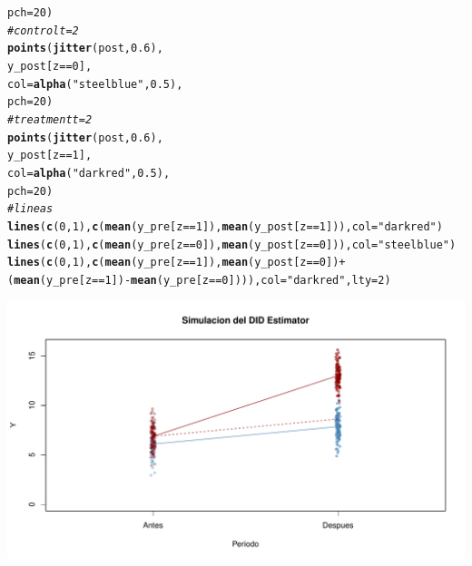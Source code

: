 \documentclass[onesided]{article}\usepackage[]{graphicx}\usepackage[]{color}
\makeatletter
\def\maxwidth{ %
  \ifdim\Gin@nat@width>\linewidth
    \linewidth
  \else
    \Gin@nat@width
  \fi
}
\newcommand{\hlnum}[1]{\textcolor[rgb]{0.686,0.059,0.569}{#1}}%
\newcommand{\hlstr}[1]{\textcolor[rgb]{0.192,0.494,0.8}{#1}}%
\newcommand{\hlcom}[1]{\textcolor[rgb]{0.678,0.584,0.686}{\textit{#1}}}%
\newcommand{\hlopt}[1]{\textcolor[rgb]{0,0,0}{#1}}%
\newcommand{\hlstd}[1]{\textcolor[rgb]{0.345,0.345,0.345}{#1}}%
\newcommand{\hlkwc}[1]{\textcolor[rgb]{0.333,0.667,0.333}{#1}}%
\newcommand{\hlkwd}[1]{\textcolor[rgb]{0.737,0.353,0.396}{\textbf{#1}}}%
\newenvironment{kframe}{%
 \def\at@end@of@kframe{}%
 \ifinner\ifhmode%
  \def\at@end@of@kframe{\end{minipage}}%
  \begin{minipage}{\columnwidth}%
 \fi\fi%
 \def\FrameCommand##1{\hskip\@totalleftmargin \hskip-\fboxsep
 \colorbox{shadecolor}{##1}\hskip-\fboxsep
     \hskip-\linewidth \hskip-\@totalleftmargin \hskip\columnwidth}%
 \MakeFramed {\advance\hsize-\width
   \@totalleftmargin\z@ \linewidth\hsize
   \@setminipage}}%
 {\par\unskip\endMakeFramed%
 \at@end@of@kframe}
\newenvironment{knitrout}{}{} %
\makeatother
\begin{document}
\begin{knitrout}
\begin{kframe}
\begin{alltt}
       \hlkwc{pch} \hlstd{=} \hlnum{20}\hlstd{)}
\hlcom{# control t=2}
\hlkwd{points}\hlstd{(}\hlkwd{jitter}\hlstd{(post,} \hlnum{0.6}\hlstd{),}
       \hlstd{y_post[z} \hlopt{==} \hlnum{0}\hlstd{],}
       \hlkwc{col} \hlstd{=} \hlkwd{alpha}\hlstd{(}\hlstr{"steelblue"}\hlstd{,} \hlnum{0.5}\hlstd{),}
       \hlkwc{pch} \hlstd{=} \hlnum{20}\hlstd{)}
\hlcom{# treatment t=2}
\hlkwd{points}\hlstd{(}\hlkwd{jitter}\hlstd{(post,} \hlnum{0.6}\hlstd{),}
       \hlstd{y_post[z} \hlopt{==} \hlnum{1}\hlstd{],}
       \hlkwc{col} \hlstd{=} \hlkwd{alpha}\hlstd{(}\hlstr{"darkred"}\hlstd{,} \hlnum{0.5}\hlstd{),}
       \hlkwc{pch} \hlstd{=} \hlnum{20}\hlstd{)}
\hlcom{# lineas}
\hlkwd{lines}\hlstd{(}\hlkwd{c}\hlstd{(}\hlnum{0}\hlstd{,} \hlnum{1}\hlstd{),} \hlkwd{c}\hlstd{(}\hlkwd{mean}\hlstd{(y_pre[z} \hlopt{==} \hlnum{1}\hlstd{]),} \hlkwd{mean}\hlstd{(y_post[z} \hlopt{==} \hlnum{1}\hlstd{])),} \hlkwc{col} \hlstd{=} \hlstr{"darkred"}\hlstd{)}
\hlkwd{lines}\hlstd{(}\hlkwd{c}\hlstd{(}\hlnum{0}\hlstd{,} \hlnum{1}\hlstd{),} \hlkwd{c}\hlstd{(}\hlkwd{mean}\hlstd{(y_pre[z} \hlopt{==} \hlnum{0}\hlstd{]),} \hlkwd{mean}\hlstd{(y_post[z} \hlopt{==} \hlnum{0}\hlstd{])),} \hlkwc{col} \hlstd{=} \hlstr{"steelblue"}\hlstd{)}
\hlkwd{lines}\hlstd{(}\hlkwd{c}\hlstd{(}\hlnum{0}\hlstd{,} \hlnum{1}\hlstd{),} \hlkwd{c}\hlstd{(}\hlkwd{mean}\hlstd{(y_pre[z} \hlopt{==} \hlnum{1}\hlstd{]),} \hlkwd{mean}\hlstd{(y_post[z} \hlopt{==} \hlnum{0}\hlstd{])} \hlopt{+}
\hlstd{(}\hlkwd{mean}\hlstd{(y_pre[z} \hlopt{==} \hlnum{1}\hlstd{])}\hlopt{-}\hlkwd{mean}\hlstd{(y_pre[z} \hlopt{==} \hlnum{0}\hlstd{]))),} \hlkwc{col} \hlstd{=} \hlstr{"darkred"}\hlstd{,} \hlkwc{lty} \hlstd{=} \hlnum{2}\hlstd{)}
\end{alltt}
\end{kframe}

{\centering \includegraphics[width=\maxwidth]{figure/dif:dif:Data-1} 

}


\end{knitrout}
\end{document}
